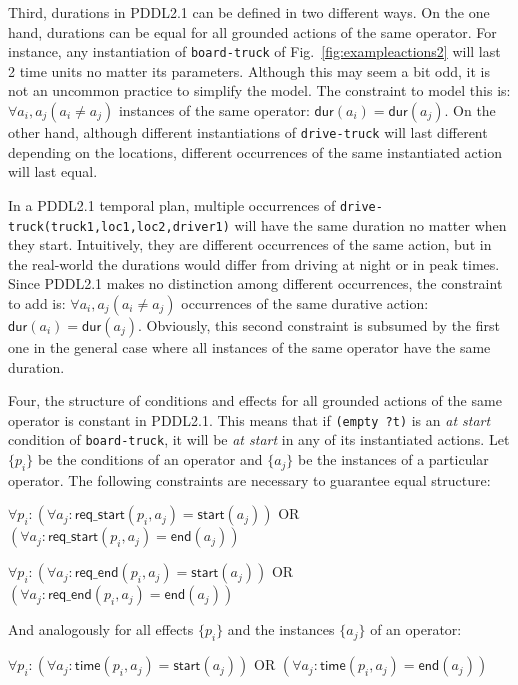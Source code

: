 \documentclass[runningheads]{llncs}
\newcommand{\dur}{\mathsf{dur}}    %
\newcommand{\start}{\mathsf{start}}%
\newcommand{\en}{\mathsf{end}}     %
\newcommand{\tim}{\mathsf{time}}   %
\newcommand{\reqs}{\mathsf{req\_{start}}} %
\newcommand{\reqe}{\mathsf{req\_{end}}}   %
\begin{document}


Third, durations in PDDL2.1 can be defined in two different ways. On the one hand, durations can be equal for all grounded actions of the same operator. For instance, any instantiation of \texttt{board-truck} of Fig.~\ref{fig:exampleactions2} will last 2 time units no matter its parameters. Although this may seem a bit odd, it is not an uncommon practice to simplify the model. The constraint to model this is: $\forall a_i,a_j (a_i \neq a_j)$ instances of the same operator: $\dur(a_i) = \dur(a_j)$. On the other hand, although different instantiations of \texttt{drive-truck} will last different depending on the locations, different occurrences of the same instantiated action will last equal.

In a PDDL2.1 temporal plan, multiple occurrences of \texttt{drive-truck(truck1,loc1,loc2,driver1)} will have the same duration no matter when they start. Intuitively, they are different occurrences of the same action, but in the real-world the durations would differ from driving at night or in peak times. Since PDDL2.1 makes no distinction among different occurrences, the constraint to add is: $\forall a_i,a_j (a_i \neq a_j)$ occurrences of the same durative action: $\dur(a_i) = \dur(a_j)$. Obviously, this second constraint is subsumed by the first one in the general case where all instances of the same operator have the same duration.


Four, the structure of conditions and effects for all grounded actions of the same operator is constant in PDDL2.1. This means that if \texttt{(empty ?t)} is an \emph{at start} condition of \texttt{board-truck}, it will be \emph{at start} in any of its instantiated actions.
Let $\{p_i\}$ be the conditions of an operator and $\{a_j\}$ be the instances of a particular operator. The following constraints are necessary to guarantee equal structure:

$\forall p_i: (\forall a_j: \reqs(p_i,a_j) = \start(a_j))$ OR $(\forall a_j: \reqs(p_i,a_j) = \en(a_j))$

$\forall p_i: (\forall a_j: \reqe(p_i,a_j) = \start(a_j))$ OR $(\forall a_j: \reqe(p_i,a_j) = \en(a_j))$

And analogously for all effects $\{p_i\}$ and the instances $\{a_j\}$ of an operator:

$\forall p_i: (\forall a_j: \tim(p_i,a_j) = \start(a_j))$ OR $(\forall a_j: \tim(p_i,a_j) = \en(a_j))$
\end{document}
